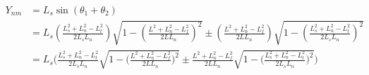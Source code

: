 \documentclass[11pt, landscape]{article}
\begin{document}
\begin{align}
  Y_{nm} &= L_s\sin(\theta_1 + \theta_2)\\
  &= L_s\left(\frac{L_{s}^2+L_{n}^2-L_{t}^2}{2L_{s}L_{n}}\right)\sqrt{1-\left(\frac{L^2+L_{n}^2-L_{f}^2}{2LL_{n}}\right)^2} \pm \left(\frac{L^2+L_{n}^2-L_{f}^2}{2LL_{n}}\right)\sqrt{1-\left(\frac{L_{s}^2+L_{n}^2-L_{t}^2}{2L_{s}L_{n}}\right)^2}\\
  &= L_{s}\Bigg(\frac{L_{s}^2+L_{n}^2-L_{t}^2}{2L_{s}L_{n}}\sqrt{1-\bigg(\frac{L^2+L_{n}^2-L_{f}^2}{2LL_{n}}\bigg)^2} \pm \frac{L^2+L_{n}^2-L_{f}^2}{2LL_{n}}\sqrt{1-\bigg(\frac{L_{s}^2+L_{n}^2-L_{t}^2}{2L_{s}L_{n}}\bigg)^2} \Bigg)\\
\end{align}
\end{document}
